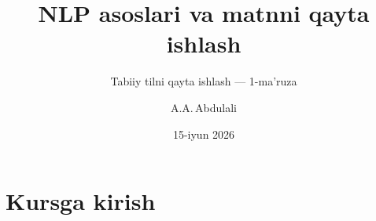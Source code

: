 \documentclass[aspectratio=169,11pt]{beamer}
\title[NLP asoslari]{NLP asoslari va matnni qayta ishlash}
\subtitle{Tabiiy tilni qayta ishlash --- 1-ma'ruza}
\author[A.A.\,Abdulali]{A.A.\,Abdulali}
\date{15-iyun 2026}
\institute{11:00--12:20 \quad$\cdot$\quad mavzu \textnumero{}1}
\begin{document}

\maketitle

\section[Kirish]{Kursga kirish}

\end{document}
